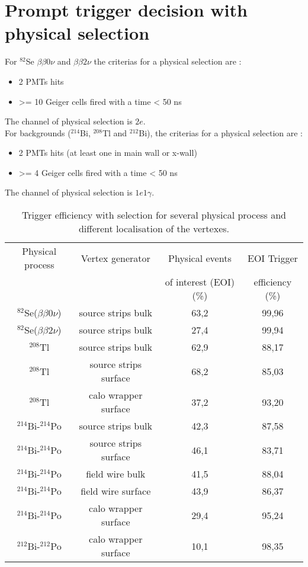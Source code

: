 \documentclass[12pt,a4paper]{article}
\newcommand{\BBZN}{$\beta\beta{}0\nu$}
\newcommand{\BBDN}{$\beta\beta{}2\nu$}
\newcommand{\SE}{$^{82}$Se}
\newcommand{\TL}{$^{208}$Tl}
\newcommand{\BIQ}{$^{214}$Bi}
\newcommand{\BID}{$^{212}$Bi}
\newcommand{\POQ}{$^{214}$Po}
\newcommand{\POD}{$^{212}$Po}
\begin{document}
\section{Prompt trigger decision with physical selection}	
For \SE{} \BBZN{} and \BBDN{} the criterias for a physical selection are : 
\begin{itemize}
 \item 2 PMTs hits
 \item >= 10 Geiger cells fired with a time < 50 ns
\end{itemize}
The channel of physical selection is $2e$.\\

For backgrounds (\BIQ, \TL{} and \BID), the criterias for a physical selection are :
\begin{itemize}
 \item 2 PMTs hits (at least one in main wall or x-wall)
 \item >= 4 Geiger cells fired with a time < 50 ns
\end{itemize}
The channel of physical selection is $1e1\gamma$.

\begin{table}[!h]
 \begin{center}
  \begin{tabular}{|c||c|c|c|}
    \hline
    Physical process   & Vertex generator      & Physical events        &  EOI Trigger      \\
	               &                       & of interest (EOI) (\%) &  efficiency (\%)  \\
    \hline
    \SE(\BBZN)         & source strips bulk    & 63,2                   & 99,96   \\
    \SE(\BBDN)         & source strips bulk    & 27,4                   & 99,94   \\
    \TL                & source strips bulk    & 62,9                   & 88,17   \\
    \TL                & source strips surface & 68,2                   & 85,03   \\
    \TL                & calo wrapper surface  & 37,2                   & 93,20   \\
    \BIQ-\POQ          & source strips bulk    & 42,3                   & 87,58   \\
    \BIQ-\POQ          & source strips surface & 46,1                   & 83,71   \\
    \BIQ-\POQ          & field wire bulk       & 41,5                   & 88,04   \\
    \BIQ-\POQ          & field wire surface    & 43,9                   & 86,37   \\
    \BIQ-\POQ          & calo wrapper surface  & 29,4                   & 95,24   \\
    \BID-\POD          & calo wrapper surface  & 10,1                   & 98,35   \\
    
    \hline
  \end{tabular}
  \end{center}
  \caption{Trigger efficiency with selection for several physical process and different localisation of the vertexes.}
\label{poi_efficacity_trigger}
\end{table}
\end{document}
